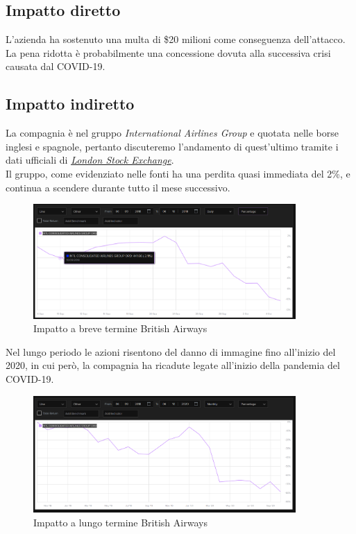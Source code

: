 \documentclass[12pt,a4paper,openright,twoside]{report}
\begin{document}
\subsection{Impatto diretto}
L'azienda ha sostenuto una multa di \$20 milioni come conseguenza dell'attacco. \cite{BritAir} La pena ridotta \`e probabilmente una concessione dovuta alla successiva crisi causata dal COVID-19.\\
\subsection{Impatto indiretto}
La compagnia \`e nel gruppo \textit{International Airlines Group} e quotata nelle borse inglesi e spagnole, pertanto discuteremo l'andamento di quest'ultimo tramite i dati ufficiali di \href{https://www.londonstockexchange.com/stock/}{\textit{London Stock Exchange}}.\\
Il gruppo, come evidenziato nelle fonti\cite{BritAir} ha una perdita quasi immediata del 2\%, e continua a scendere durante tutto il mese successivo.

\begin{figure}[H] 
\begin{center} 
\includegraphics[width=10cm]{figures/britAir_short.png} 
\caption[Grafico British Airways short]{Impatto a breve termine British Airways}\label{fig:britair1}
\end{center}
\end{figure}

Nel lungo periodo le azioni risentono del danno di immagine fino all'inizio del 2020, in cui per\`o, la compagnia ha ricadute legate all'inizio della pandemia del COVID-19.\\

\begin{figure}[H] 
\begin{center} 
\includegraphics[width=10cm]{figures/britAir_long.png} 
\caption[Grafico British Airways long]{Impatto a lungo termine  British Airways}\label{fig:britair2}
\end{center}
\end{figure}
\end{document}
